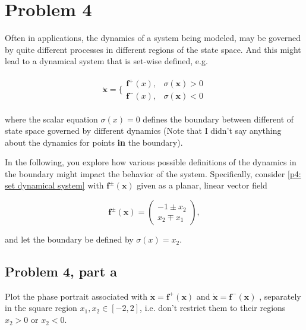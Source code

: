 \newpage
\section{Problem 4}
Often in applications, the dynamics of a system being modeled, may be governed by quite different processes in different regions of the state space. And this might lead to a dynamical system that is set-wise defined, e.g.

    \begin{align}
        \dot{\textbf{x}} = 
        \Bigg\{\begin{array}{lr}
             \textbf{f}^+(x), &\sigma(\textbf{x}) > 0\\
             \textbf{f}^-(x), &\sigma(\textbf{x}) < 0
        \end{array}
        \label{p4: set dynamical system}
    \end{align}

    where the scalar equation $\sigma(x) = 0$ defines the boundary between different of state space governed by different dynamics (Note that I didn’t say anything about the dynamics for points \textbf{in} the boundary).
 
    \jump
    In the following, you explore how various possible definitions of the dynamics in the boundary might impact the behavior of the system. Specifically, consider \ref{p4: set dynamical system} with $\textbf{f}^\pm(\textbf{x})$ given as a planar, linear vector field

    \[
    \textbf{f}^\pm (\textbf{x}) = \begin{pmatrix}
         -1 \pm x_2\\
         x_2 \mp x_1
    \end{pmatrix},
    \]

    and let the boundary be defined by $\sigma(x) = x_2$.

\subsection{Problem 4, part a}
Plot the phase portrait associated with $\dot{\textbf{x}} = \textbf{f}^+(\textbf{x})$ and $\dot{\textbf{x}} = \textbf{f}^-(\textbf{x})$ , separately in the square region $x_1, x_2 \in [-2, 2]$, i.e. don’t restrict them to their regions $x_2 > 0$ or $x_2 < 0$.

